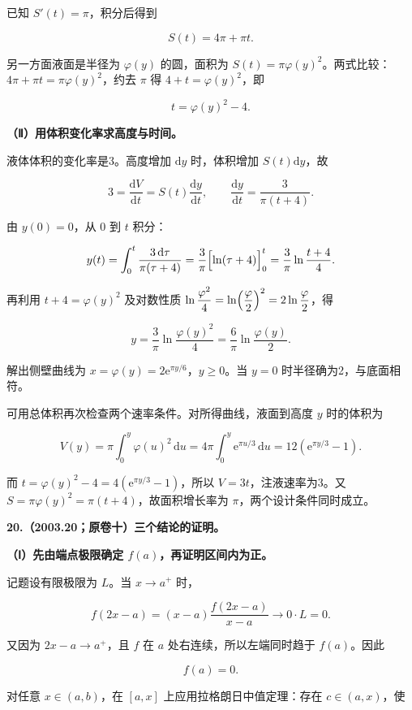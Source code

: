 \documentclass[UTF8,11pt,fontset=windows]{ctexart}
\begin{document}
已知 $S'(t)=\pi$，积分后得到

$$
S(t)=4\pi+\pi t.
$$

另一方面液面是半径为 $\varphi(y)$ 的圆，面积为 $S(t)=\pi\varphi(y)^2$。两式比较：$4\pi+\pi t=\pi\varphi(y)^2$，约去 $\pi$ 得 $4+t=\varphi(y)^2$，即

$$
t=\varphi(y)^2-4.
$$

\textbf{（Ⅱ）用体积变化率求高度与时间。}

液体体积的变化率是3。高度增加 $\mathrm dy$ 时，体积增加 $S(t)\mathrm dy$，故

$$
3=\frac{\mathrm dV}{\mathrm dt}=S(t)\frac{\mathrm dy}{\mathrm dt},
\qquad \frac{\mathrm dy}{\mathrm dt}=\frac3{\pi(t+4)}.
$$

由 $y(0)=0$，从 $0$ 到 $t$ 积分：

$$
y(t)=\int_0^t\frac{3\,\mathrm d\tau}{\pi(\tau+4)}
=\frac3\pi\Bigl[\ln(\tau+4)\Bigr]_0^t
=\frac3\pi\ln\frac{t+4}{4}.
$$

再利用 $t+4=\varphi(y)^2$ 及对数性质 $\ln\dfrac{\varphi^2}{4}=\ln\Bigl(\dfrac{\varphi}2\Bigr)^{2}=2\ln\dfrac{\varphi}2$，得

$$
y=\frac3\pi\ln\frac{\varphi(y)^2}{4}
=\frac6\pi\ln\frac{\varphi(y)}2.
$$

解出侧壁曲线为 $x=\varphi(y)=2\mathrm e^{\pi y/6}$，$y\ge0$。当 $y=0$ 时半径确为2，与底面相符。

可用总体积再次检查两个速率条件。对所得曲线，液面到高度 $y$ 时的体积为

$$
V(y)=\pi\int_0^y\varphi(u)^2\,\mathrm du
=4\pi\int_0^y\mathrm e^{\pi u/3}\,\mathrm du
=12(\mathrm e^{\pi y/3}-1).
$$

而 $t=\varphi(y)^2-4=4(\mathrm e^{\pi y/3}-1)$，所以 $V=3t$，注液速率为3。又 $S=\pi\varphi(y)^2=\pi(t+4)$，故面积增长率为 $\pi$，两个设计条件同时成立。

\clearpage

\textbf{20.（2003.20；原卷十）三个结论的证明。}

\textbf{（Ⅰ）先由端点极限确定 $f(a)$，再证明区间内为正。}

记题设有限极限为 $L$。当 $x\to a^+$ 时，

$$
f(2x-a)=(x-a)\frac{f(2x-a)}{x-a}\longrightarrow0\cdot L=0.
$$

又因为 $2x-a\to a^+$，且 $f$ 在 $a$ 处右连续，所以左端同时趋于 $f(a)$。因此

$$
f(a)=0.
$$

对任意 $x\in(a,b)$，在 $[a,x]$ 上应用拉格朗日中值定理：存在 $c\in(a,x)$，使
\end{document}
